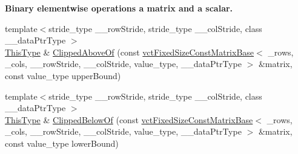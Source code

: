 \begin{Indent}{\bf Binary elementwise operations a matrix and a scalar.}
\begin{DoxyCompactItemize}
\item 
{\footnotesize template$<$stride\-\_\-type \-\_\-\-\_\-row\-Stride, stride\-\_\-type \-\_\-\-\_\-col\-Stride, class \-\_\-\-\_\-data\-Ptr\-Type $>$ }\\\hyperlink{classvct_fixed_size_const_matrix_base_a7ec66a96ed7e08ce9ff54093133c9d8d}{This\-Type} \& \hyperlink{classvct_fixed_size_matrix_base_aa4a2ea85e9cac6364666a0b7c05ef021}{Clipped\-Above\-Of} (const \hyperlink{classvct_fixed_size_const_matrix_base}{vct\-Fixed\-Size\-Const\-Matrix\-Base}$<$ \-\_\-rows, \-\_\-cols, \-\_\-\-\_\-row\-Stride, \-\_\-\-\_\-col\-Stride, value\-\_\-type, \-\_\-\-\_\-data\-Ptr\-Type $>$ \&matrix, const value\-\_\-type upper\-Bound)
\item 
{\footnotesize template$<$stride\-\_\-type \-\_\-\-\_\-row\-Stride, stride\-\_\-type \-\_\-\-\_\-col\-Stride, class \-\_\-\-\_\-data\-Ptr\-Type $>$ }\\\hyperlink{classvct_fixed_size_const_matrix_base_a7ec66a96ed7e08ce9ff54093133c9d8d}{This\-Type} \& \hyperlink{classvct_fixed_size_matrix_base_acc63e84cde34877936a832f705d5fa84}{Clipped\-Below\-Of} (const \hyperlink{classvct_fixed_size_const_matrix_base}{vct\-Fixed\-Size\-Const\-Matrix\-Base}$<$ \-\_\-rows, \-\_\-cols, \-\_\-\-\_\-row\-Stride, \-\_\-\-\_\-col\-Stride, value\-\_\-type, \-\_\-\-\_\-data\-Ptr\-Type $>$ \&matrix, const value\-\_\-type lower\-Bound)
\end{DoxyCompactItemize}
\end{Indent}
